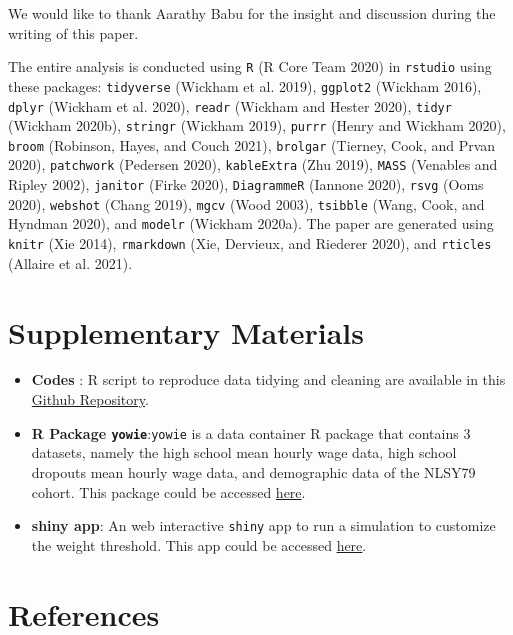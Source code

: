 \documentclass{article}
\begin{document}
We would like to thank Aarathy Babu for the insight and discussion during the writing of this paper.

The entire analysis is conducted using \texttt{R} (R Core Team 2020) in \texttt{rstudio} using these packages: \texttt{tidyverse} (Wickham et al. 2019), \texttt{ggplot2} (Wickham 2016), \texttt{dplyr} (Wickham et al. 2020), \texttt{readr} (Wickham and Hester 2020), \texttt{tidyr} (Wickham 2020b), \texttt{stringr} (Wickham 2019), \texttt{purrr} (Henry and Wickham 2020), \texttt{broom} (Robinson, Hayes, and Couch 2021), \texttt{brolgar} (Tierney, Cook, and Prvan 2020), \texttt{patchwork} (Pedersen 2020), \texttt{kableExtra} (Zhu 2019), \texttt{MASS} (Venables and Ripley 2002), \texttt{janitor} (Firke 2020), \texttt{DiagrammeR} (Iannone 2020), \texttt{rsvg} (Ooms 2020), \texttt{webshot} (Chang 2019), \texttt{mgcv} (Wood 2003), \texttt{tsibble} (Wang, Cook, and Hyndman 2020), and \texttt{modelr} (Wickham 2020a). The paper are generated using \texttt{knitr} (Xie 2014), \texttt{rmarkdown} (Xie, Dervieux, and Riederer 2020), and \texttt{rticles} (Allaire et al. 2021).

\hypertarget{supplementary-materials}{%
\section{Supplementary Materials}\label{supplementary-materials}}

\begin{itemize}
\item
  \textbf{Codes} : R script to reproduce data tidying and cleaning are available in this \href{https://github.com/numbats/yowie/blob/master/data-raw/data_preprocessing.R}{Github Repository}.
\item
  \textbf{R Package \texttt{yowie}}:\texttt{yowie} is a data container R package that contains 3 datasets, namely the high school mean hourly wage data, high school dropouts mean hourly wage data, and demographic data of the NLSY79 cohort. This package could be accessed \href{https://github.com/numbats/yowie}{here}.
\item
  \textbf{shiny app}: An web interactive \texttt{shiny} app to run a simulation to customize the weight threshold. This app could be accessed \href{https://github.com/numbats/summer-wages-refresh/tree/main/app}{here}.
\end{itemize}

\hypertarget{references}{%
\section*{References}\label{references}}
\end{document}
